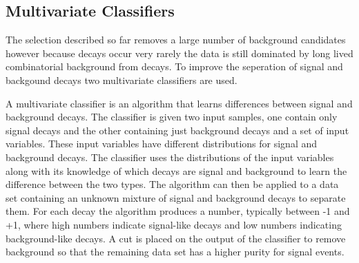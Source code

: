 



\subsection{Multivariate Classifiers}
\label{sec:MVC}

The selection described so far removes a large number of background candidates however because \bmumu decays occur very rarely the data is still dominated by long lived combinatorial background from \bbbarmumux decays. To improve the seperation of signal and backgound decays two  multivariate classifiers are used.

A multivariate classifier is an algorithm that learns differences between signal and background decays. The classifier is given two input samples, one contain only signal decays and the other containing just background decays and a set of input variables. These input variables have different distributions for signal and background decays. The classifier uses the distributions of the input variables along with its knowledge of which decays are signal and background to learn the difference between the two types. The algorithm can then be applied to a data set containing an unknown mixture of signal and background decays to separate them. For each decay the algorithm produces a number, typically between -1 and +1, where high numbers indicate signal-like decays and low numbers indicating background-like decays. A cut is placed on the output of the classifier to remove background so that the remaining data set has a higher purity for signal events.

